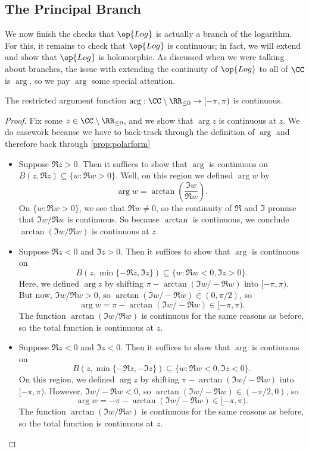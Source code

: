 \subsection{The Principal Branch}
We now finish the checks that $\op{Log}$ is actually a branch of the logarithm. For this, it remains to check that $\op{Log}$ is continuous; in fact, we will extend and show that $\op{Log}$ is holomorphic. As discussed when we were talking about branches, the issue with extending the continuity of $\op{Log}$ to all of $\CC$ is $\arg$, so we pay $\arg$ some special attention.
\begin{lemma} \label{lem:argcont}
	The restricted argument function $\arg:\CC\setminus\RR_{\le0}\to[-\pi,\pi)$ is continuous.
\end{lemma}
\begin{proof}
	Fix some $z\in\CC\setminus\RR_{\le0}$, and we show that $\arg z$ is continuous at $z$. We do casework because we have to back-track through the definition of $\arg$ and therefore back through \autoref{prop:polarform}
	\begin{itemize}
		\item Suppose $\Re z>0$. Then it suffices to show that $\arg$ is continuous on $B(z,\Re z)\subseteq\{w:\Re w>0\}$. Well, on this region we defined $\arg w$ by
		\[\arg w=\arctan\left(\frac{\Im w}{\Re w}\right).\]
		On $\{w:\Re w>0\}$, we see that $\Re w\ne0$, so the continuity of $\Re$ and $\Im$ promise that $\Im w/\Re w$ is continuous. So because $\arctan$ is continuous, we conclude $\arctan(\Im w/\Re w)$ is continuous at $z$.
		\item Suppose $\Re z<0$ and $\Im z>0$. Then it suffices to show that $\arg$ is continuous on
		\[B(z,\min\{-\Re z,\Im z\})\subseteq\{w:\Re w<0,\Im z>0\}.\]
		Here, we defined $\arg z$ by shifting $\pi-\arctan(\Im w/-\Re w)$ into $[-\pi,\pi)$. But now, $\Im w/\Re w>0$, so $\arctan(\Im w/-\Re w)\in(0,\pi/2)$, so
		\[\arg w=\pi-\arctan(\Im w/-\Re w)\in[-\pi,\pi).\]
		The function $\arctan(\Im w/\Re w)$ is continuous for the same reasons as before, so the total function is continuous at $z$.
		\item Suppose $\Re z<0$ and $\Im z<0$. Then it suffices to show that $\arg$ is continuous on
		\[B(z,\min\{-\Re z,-\Im z\})\subseteq\{w:\Re w<0,\Im z<0\}.\]
		On this region, we defined $\arg z$ by shifting $\pi-\arctan(\Im w/-\Re w)$ into $[-\pi,\pi)$. However, $\Im w/-\Re w<0$, so $\arctan(\Im w/-\Re w)\in(-\pi/2,0)$, so
		\[\arg w=-\pi-\arctan(\Im w/-\Re w)\in[-\pi,\pi).\]
		The function $\arctan(\Im w/\Re w)$ is continuous for the same reasons as before, so the total function is continuous at $z$.

\end{itemize}
\end{proof}
